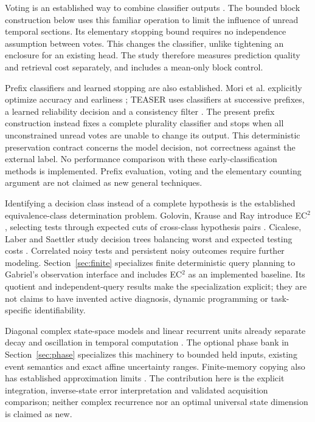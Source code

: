 \documentclass[11pt,a4paper]{article}
\theoremstyle{definition}\newtheorem{definition}[theorem]{Definition}
\begin{document}
Voting is an established way to combine classifier outputs \cite{dietterich2000}. The bounded block construction below uses this familiar operation to limit the influence of unread temporal sections. Its elementary stopping bound requires no independence assumption between votes. This changes the classifier, unlike tightening an enclosure for an existing head. The study therefore measures prediction quality and retrieval cost separately, and includes a mean-only block control.

Prefix classifiers and learned stopping are also established. Mori et al. explicitly optimize accuracy and earliness \cite{mori2018}; TEASER uses classifiers at successive prefixes, a learned reliability decision and a consistency filter \cite{schaefer2020}. The present prefix construction instead fixes a complete plurality classifier and stops when all unconstrained unread votes are unable to change its output. This deterministic preservation contract concerns the model decision, not correctness against the external label. No performance comparison with these early-classification methods is implemented. Prefix evaluation, voting and the elementary counting argument are not claimed as new general techniques.

Identifying a decision class instead of a complete hypothesis is the established equivalence-class determination problem. Golovin, Krause and Ray introduce EC$^2$, selecting tests through expected cuts of cross-class hypothesis pairs \cite{golovin2010}. Cicalese, Laber and Saettler study decision trees balancing worst and expected testing costs \cite{cicalese2014}. Correlated noisy tests \cite{chen2017} and persistent noisy outcomes \cite{jia2024} require further modeling. Section~\ref{sec:finite} specializes finite deterministic query planning to Gabriel's observation interface and includes EC$^2$ as an implemented baseline. Its quotient and independent-query results make the specialization explicit; they are not claims to have invented active diagnosis, dynamic programming or task-specific identifiability.

Diagonal complex state-space models and linear recurrent units already separate decay and oscillation in temporal computation \cite{gu2022diagonal,orvieto2023}. The optional phase bank in Section~\ref{sec:phase} specializes this machinery to bounded held inputs, existing event semantics and exact affine uncertainty ranges. Finite-memory copying also has established approximation limits \cite{francois2025}. The contribution here is the explicit integration, inverse-state error interpretation and validated acquisition comparison; neither complex recurrence nor an optimal universal state dimension is claimed as new.
\end{document}
